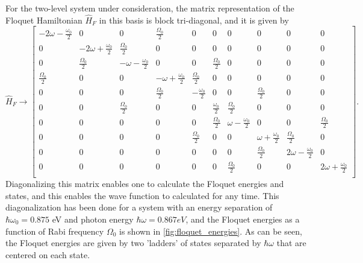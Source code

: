 For the two-level system under consideration, the matrix representation of the Floquet Hamiltonian $\hat{H}_F$ in this basis is block tri-diagonal, and it is given by
\begin{equation}
	\hat{H}_F \rightarrow
	\left[
	\begin{smallmatrix}%
	-2 \omega-\frac{\omega_0}{2} & 0 & 0 & \frac{\Omega_0}{2} & 0 & 0 & 0 & 0 & 0 & 0 \\
	0 & -2 \omega +\frac{\omega_0}{2} & \frac{\Omega_0}{2} & 0 & 0 & 0 & 0 & 0 & 0 & 0 \\%
	0 & \frac{\Omega_0}{2} & -\omega-\frac{\omega_0}{2} & 0 & 0 & \frac{\Omega_0}{2} & 0 & 0 & 0
	& 0 \\
	\frac{\Omega_0}{2} & 0 & 0 & -\omega + \frac{\omega_0}{2} & \frac{\Omega_0}{2} & 0 & 0 & 0 & 0 &
	0 \\ %
	0 & 0 & 0 & \frac{\Omega_0}{2} & -\frac{\omega_0}{2} & 0 & 0 & \frac{\Omega_0}{2} & 0 &
	0 \\
	0 & 0 & \frac{\Omega_0}{2} & 0 & 0 & \frac{\omega_0}{2} & \frac{\Omega_0}{2} & 0 & 0 & 0
	\\ %
	0 & 0 & 0 & 0 & 0 & \frac{\Omega_0}{2} & \omega-\frac{\omega_0}{2} & 0 & 0 &
	\frac{\Omega_0}{2} \\
	0 & 0 & 0 & 0 & \frac{\Omega_0}{2} & 0 & 0 & \omega+\frac{\omega_0}{2} & \frac{\Omega_0}{2} &
	0 \\ %
	0 & 0 & 0 & 0 & 0 & 0 & 0 & \frac{\Omega_0}{2} & 2 \omega-\frac{\omega_0}{2} & 0 \\
	0 & 0 & 0 & 0 & 0 & 0 & \frac{\Omega_0}{2} & 0 & 0 & 2 \omega+\frac{\omega_0}{2} \\
	\end{smallmatrix}
	\right].
\end{equation}
Diagonalizing this matrix enables one to calculate the Floquet energies and states, and this enables the wave function to calculated for any time.  This diagonalization has been done for a system with an energy separation of $\hbar\omega_0=0.875$ eV and photon energy $\hbar\omega=0.867 eV$, and the Floquet energies as a function of Rabi frequency $\Omega_0$ is shown in \ref{fig:floquet_energies}. As can be seen, the Floquet energies are given by two 'ladders' of states separated by $\hbar\omega$ that are centered on each state.

